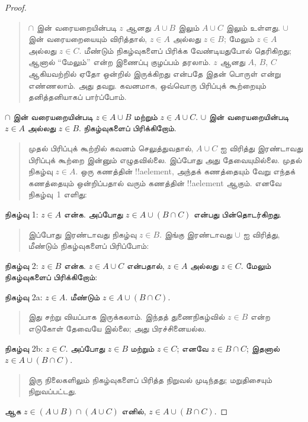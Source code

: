 \documentclass[../../../include/open-logic-section]{subfiles}
\begin{document}
\begin{proof}
\begin{quote}
$\cap$ இன் வரையறையின்படி $z$ ஆனது $A \cup B$
இலும் $A \cup C$ இலும் உள்ளது. $\cup$ இன்
வரையறையையும் விரித்தால், $z \in A$ அல்லது
$z \in B$; மேலும் $z \in A$ அல்லது $z \in C$.
மீண்டும் நிகழ்வுகளைப் பிரிக்க வேண்டியதுபோல் தெரிகிறது;
ஆனால் ``மேலும்'' என்ற இணைப்பு குழப்பம் தரலாம்.
$z$ ஆனது $A$, $B$, $C$ ஆகியவற்றில் ஏதோ ஒன்றில்
இருக்கிறது என்பதே இதன் பொருள் என்று எண்ணலாம்.
அது தவறு. கவனமாக, ஒவ்வொரு பிரிப்புக் கூற்றையும்
தனித்தனியாகப் பார்ப்போம்.
\end{quote}
$\cap$ இன் வரையறையின்படி $z \in A \cup B$
மற்றும் $z \in A \cup C$. $\cup$ இன் வரையறையின்படி
$z \in A$ அல்லது $z \in B$. நிகழ்வுகளைப்
பிரிக்கிறோம்.
\begin{quote}
முதல் பிரிப்புக் கூற்றில் கவனம் செலுத்துவதால்,
$A \cup C$ ஐ விரித்து இரண்டாவது பிரிப்புக் கூற்றை
இன்னும் எழுதவில்லை. இப்போது அது தேவையுமில்லை.
முதல் நிகழ்வு $z \in A$. ஒரு கணத்தின்
!!a{element}, அந்தக் கணத்தையும் வேறு எந்தக்
கணத்தையும் ஒன்றிப்பதால் வரும் கணத்தின்
!!a{element} ஆகும். எனவே நிகழ்வு~1 எளிது:
\end{quote}
நிகழ்வு 1: $z \in A$ என்க. அப்போது
$z \in A \cup (B \cap C)$ என்பது பின்தொடர்கிறது.

\begin{quote}
இப்போது இரண்டாவது நிகழ்வு $z \in B$.
இங்கு இரண்டாவது $\cup$ ஐ விரித்து, மீண்டும்
நிகழ்வுகளைப் பிரிப்போம்:
\end{quote}
நிகழ்வு 2: $z \in B$ என்க. $z \in A \cup C$
என்பதால், $z \in A$ அல்லது $z \in C$.
மேலும் நிகழ்வுகளைப் பிரிக்கிறோம்:

நிகழ்வு 2a: $z \in A$. மீண்டும்
$z \in A \cup (B \cap C)$.
\begin{quote}
இது சற்று வியப்பாக இருக்கலாம். இந்தத் துணைநிகழ்வில்
$z \in B$ என்ற எடுகோள் தேவையே இல்லை;
அது பிரச்சினையல்ல.
\end{quote}
நிகழ்வு 2b: $z \in C$. அப்போது $z \in B$
மற்றும் $z \in C$; எனவே $z \in B \cap C$;
இதனால் $z \in A \cup (B \cap C)$.
\begin{quote}
இரு நிலைகளிலும் நிகழ்வுகளைப் பிரித்த நிறுவல்
முடிந்தது; மறுதிசையும் நிறுவப்பட்டது.
\end{quote}
ஆக $z \in (A \cup B) \cap (A \cup C)$ எனில்,
$z \in A \cup (B \cap C)$.
\end{proof}
\end{document}
